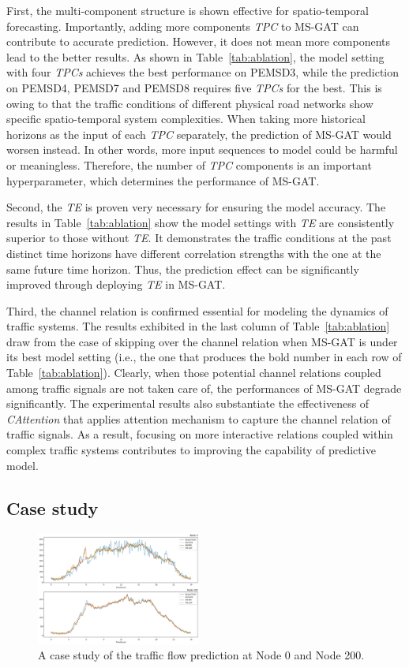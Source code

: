 First,  the multi-component structure is shown effective for spatio-temporal forecasting. Importantly, adding more components \textit{TPC}  to MS-GAT can contribute to accurate prediction. However, it does not mean  more components lead to the better results. As shown in Table~\ref{tab:ablation}, the model setting with four \textit{TPCs} achieves the best performance on PEMSD3, while the prediction on PEMSD4, PEMSD7 and PEMSD8 requires five \textit{TPCs} for the best. This is owing to that the traffic conditions of different physical road networks show specific spatio-temporal system complexities. When taking more historical horizons as the input of each \textit{TPC} separately, the prediction of MS-GAT would worsen instead. In other words, more input sequences to model could be harmful or meaningless. Therefore, the number of \textit{TPC} components is an important hyperparameter, which determines the performance of MS-GAT.

Second, the \textit{TE} is proven very necessary for ensuring the model accuracy. The  results in Table~\ref{tab:ablation} show the model settings with \textit{TE} are consistently superior to those without \textit{TE}. It demonstrates the traffic conditions at the past distinct time horizons have different correlation strengths with the one at the same future time horizon. Thus, the prediction effect can be significantly improved through deploying \textit{TE} in MS-GAT.

Third, the channel relation is confirmed essential for modeling the dynamics of traffic systems. The results exhibited in the last column of Table~\ref{tab:ablation} draw from the case of skipping over the channel relation when MS-GAT is under its best model setting (i.e., the one that produces the bold number in each row of Table~\ref{tab:ablation}). Clearly, when those potential channel relations coupled among traffic signals are not taken care of, the performances of MS-GAT degrade significantly. The experimental results also substantiate the effectiveness of \textit{CAttention} that applies attention mechanism to capture the channel relation of traffic signals. As a result, focusing on more interactive relations coupled within complex traffic systems contributes to improving the capability of predictive model.

\subsection{Case study}

\begin{figure}[!ht]
    \centering
    \includegraphics[width=0.48\textwidth]{pictures/Case_1.png}
    \caption{A case study of the traffic flow prediction at Node 0 and Node 200.}
    \label{fig:case_1}
\end{figure}

